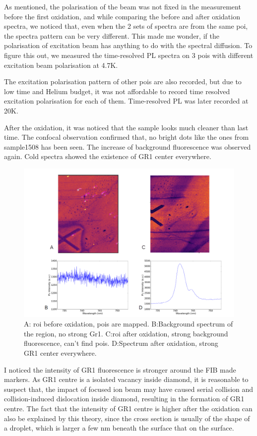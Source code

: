As mentioned, the polarisation of the beam was not fixed in the measurement before the first oxidation, and while comparing the before and after oxidation spectra, we noticed that, even when the 2 sets of spectra are from the same poi, the spectra pattern can be very different. This made me wonder, if the polarisation of excitation beam has anything to do with the spectral diffusion. To figure this out, we measured the time-resolved PL spectra on 3 pois with different excitation beam polarisation at 4.7K.

The excitation polarisation pattern of other pois are also recorded, but due to low time and Helium budget, it was not affordable to record time resolved excitation polarisation for each of them. Time-resolved PL was later recorded at 20K.

After the oxidation, it was noticed that the sample looks much cleaner than last time. The confocal observation confirmed that, no bright dots like the ones from sample1508 has been seen. The increase of background fluorescence was observed again. Cold spectra showed the existence of GR1 center everywhere.

\begin{figure}[h]
\centering
\includegraphics[width=0.7\linewidth]{Figures/pic/afteroxidation2}
\caption{A: roi before oxidation, pois are mapped. B:Background spectrum of the region, no strong Gr1. C:roi after oxidation, strong background fluorescence, can't find pois. D:Spectrum after oxidation, strong GR1 center everywhere.}
\label{fig:wp20160921204221proli}
\end{figure}

I noticed the intensity of GR1 fluorescence is stronger around the FIB made markers. As GR1 centre is a isolated vacancy inside diamond, it is reasonable to suspect that, the impact of focused ion beam may have caused serial collision and collision-induced dislocation inside diamond, resulting in the formation of GR1 centre. The fact that the intensity of GR1 centre is higher after the oxidation can also be explained by this theory, since the cross section is usually of the shape of a droplet, which is larger a few nm beneath the surface that on the surface.

